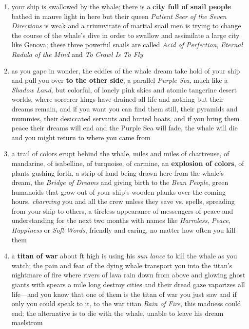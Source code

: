 \documentclass[11pt]{bxart}
\begin{document}
\begin{enumerate}
\item your ship is swallowed by the whale; there is a \textbf{city
  full of snail people} bathed in mauve light in here but their queen
  \textit{Patient Seer of the Seven Directions} is weak and a
  triumvirate of martial snail men is trying to change the course of
  the whale's dive in order to swallow and assimilate a large city
  like Genova; these three powerful snails are called \textit{Acid of
    Perfection}, \textit{Eternal Radula of the Mind} and \textit{To
    Crawl Is To Fly}

\item as you gape in wonder, the eddies of the whale dream take hold
  of your ship and pull you over \textbf{to the other side}, a
  parallel \textit{Purple Sea}, much like a \textit{Shadow Land}, but
  colorful, of lonely pink skies and atomic tangerine desert worlds,
  where sorcerer kings have drained all life and nothing but their
  dreams remain, and if you want you can find them still, their
  pyramids and mummies, their desiccated servants and buried boats,
  and if you bring them peace their dreams will end and the Purple Sea
  will fade, the whale will die and you might return to where you came
  from

\item a trail of colors erupt behind the whale, miles and miles of
  chartreuse, of mandarine, of isabelline, of turquoise, of carmine,
  an \textbf{explosion of colors}, of plants gushing forth, a strip of
  land being drawn here from the whale's dream, the \textit{Bridge of
    Dreams} and giving birth to the \textit{Bean People}, green
  humanoids that grow out of your ship's wooden planks over the coming
  hours, \textit{charming} you and all the crew unless they save vs.
  spells, spreading from your ship to others, a tireless appearance of
  messengers of peace and understanding for the next two months with
  names like \textit{Harmless}, \textit{Peace}, \textit{Happiness} or
  \textit{Soft Words}, friendly and caring, no matter how often you
  kill them

\item a \textbf{titan of war} about \unit[200]{ft} high is using his
  \textit{sun lance} to kill the whale as you watch; the pain and fear
  of the dying whale transport you into the titan's nightmare of fire
  where rivers of lava rain down from above and glowing ghost giants
  with spears a mile long destroy cities and their dread gaze
  vaporizes all life—and you know that one of them is the titan of war
  you just saw and if only you could speak to it, to the war titan
  \textit{Rain of Fire}, this madness could end; the alternative is to
  die with the whale, unable to leave his dream maelstrom


\end{enumerate}
\end{document}
